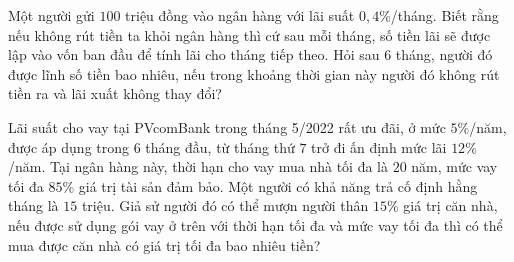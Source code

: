 \begin{ex}%
	Một người gửi $100$ triệu đồng vào ngân hàng với lãi suất $0{,}4$\%/tháng. Biết rằng nếu không rút tiền ta khỏi ngân hàng thì cứ sau mỗi tháng, số tiền lãi sẽ được lập vào vốn ban đầu để tính lãi cho tháng tiếp theo. Hỏi sau $6$ tháng, người đó được lĩnh số tiền bao nhiêu, nếu trong khoảng thời gian này người đó  không rút tiền ra và lãi xuất không thay đổi?
\end{ex}

\begin{ex}%
	Lãi suất cho vay tại PVcomBank trong tháng 5/2022 rất ưu đãi, ở mức $5\%$/năm, được  áp dụng trong $6$ tháng đầu, từ tháng thứ $7$ trở đi ấn định mức lãi $12\%$/năm. Tại ngân hàng này, thời hạn cho vay mua nhà tối đa là $20$ năm, mức vay tối đa $85\%$ giá trị tài sản đảm bảo. Một người có khả năng trả cố định hằng tháng là $15$ triệu. Giả sử người đó có thể mượn người thân $15\%$ giá trị căn nhà, nếu được sử dụng gói vay ở trên với thời hạn tối đa và mức vay tối đa thì có thể mua được căn nhà có giá trị tối đa bao nhiêu tiền?
\end{ex}
